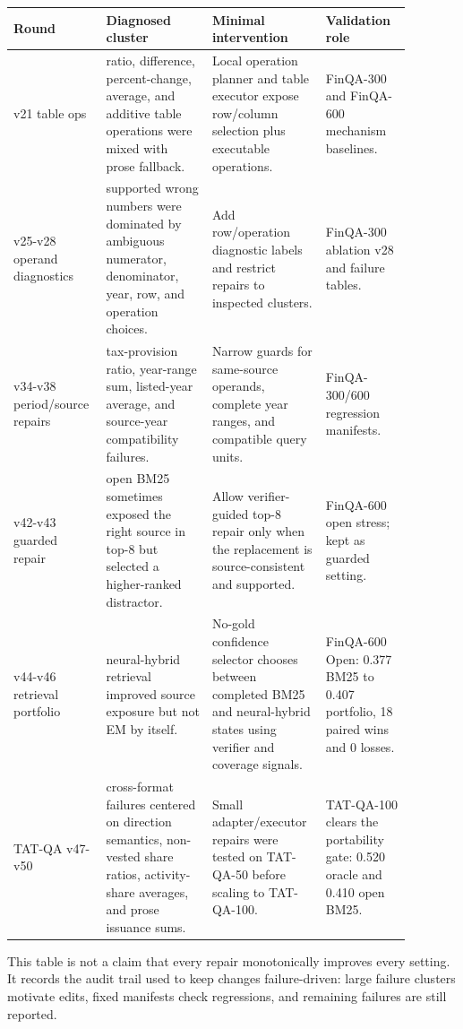 \begin{center}
\small
\begin{tabular}{p{0.18\linewidth}p{0.25\linewidth}p{0.25\linewidth}p{0.20\linewidth}}
\hline
Round & Diagnosed cluster & Minimal intervention & Validation role \\
\hline
v21 table ops & ratio, difference, percent-change, average, and additive table
operations were mixed with prose fallback. & Local operation planner and table
executor expose row/column selection plus executable operations. & FinQA-300
and FinQA-600 mechanism baselines. \\
v25-v28 operand diagnostics & supported wrong numbers were dominated by
ambiguous numerator, denominator, year, row, and operation choices. & Add
row/operation diagnostic labels and restrict repairs to inspected clusters. &
FinQA-300 ablation v28 and failure tables. \\
v34-v38 period/source repairs & tax-provision ratio, year-range sum, listed-year
average, and source-year compatibility failures. & Narrow guards for same-source
operands, complete year ranges, and compatible query units. & FinQA-300/600
regression manifests. \\
v42-v43 guarded repair & open BM25 sometimes exposed the right source in top-8
but selected a higher-ranked distractor. & Allow verifier-guided top-8 repair
only when the replacement is source-consistent and supported. & FinQA-600 open
stress; kept as guarded setting. \\
v44-v46 retrieval portfolio & neural-hybrid retrieval improved source exposure
but not EM by itself. & No-gold confidence selector chooses between completed
BM25 and neural-hybrid states using verifier and coverage signals. & FinQA-600
Open: 0.377 BM25 to 0.407 portfolio, 18 paired wins and 0 losses. \\
TAT-QA v47-v50 & cross-format failures centered on direction semantics,
non-vested share ratios, activity-share averages, and prose issuance sums. &
Small adapter/executor repairs were tested on TAT-QA-50 before scaling to
TAT-QA-100. & TAT-QA-100 clears the portability gate: 0.520 oracle and 0.410
open BM25. \\
\hline
\end{tabular}
\end{center}

\noindent This table is not a claim that every repair monotonically improves
every setting.  It records the audit trail used to keep changes failure-driven:
large failure clusters motivate edits, fixed manifests check regressions, and
remaining failures are still reported.

